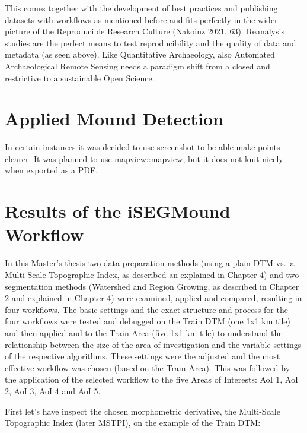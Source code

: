 \documentclass[
]{article}
\begin{document}
This comes together with the development of best practices and publishing datasets with workflows as mentioned before and fits perfectly in the wider picture of the Reproducible Research Culture (Nakoinz 2021, 63). Reanalysis studies are the perfect means to test reproducibility and the quality of data and metadata (as seen above).
Like Quantitative Archaeology, also Automated Archaeological Remote Sensing needs a paradigm shift from a closed and restrictive to a sustainable Open Science.

\newpage

\hypertarget{applied-mound-detection}{%
\section{Applied Mound Detection}\label{applied-mound-detection}}

In certain instances it was decided to use screenshot to be able make points clearer. It was planned to use mapview::mapview, but it does not knit nicely when exported as a PDF.

\newpage

\hypertarget{results-of-the-isegmound-workflow}{%
\section{Results of the iSEGMound Workflow}\label{results-of-the-isegmound-workflow}}

In this Master's thesis two data preparation methods (using a plain DTM vs.~a Multi-Scale Topographic Index, as described an explained in Chapter 4) and two segmentation methods (Watershed and Region Growing, as described in Chapter 2 and explained in Chapter 4) were examined, applied and compared, resulting in four workflows. The basic settings and the exact structure and process for the four workflows were tested and debugged on the Train DTM (one 1x1 km tile) and then applied and to the Train Area (five 1x1 km tile) to understand the relationship between the size of the area of investigation and the variable settings of the respective algorithms. These settings were the adjusted and the most effective workflow was chosen (based on the Train Area). This was followed by the application of the selected workflow to the five Areas of Interests: AoI 1, AoI 2, AoI 3, AoI 4 and AoI 5.

First let's have inspect the chosen morphometric derivative, the Multi-Scale Topographic Index (later MSTPI), on the example of the Train DTM:
\end{document}
